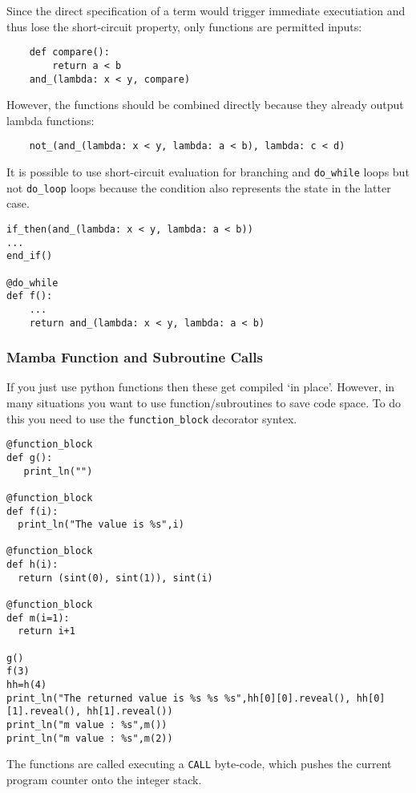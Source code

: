 Since the direct specification of a term would trigger immediate
executiation and thus lose the short-circuit property, only functions
are permitted inputs:

\begin{lstlisting}
    def compare():
        return a < b
    and_(lambda: x < y, compare)
\end{lstlisting}
However, the functions should be combined directly because they
already output lambda functions:

\begin{lstlisting}
    not_(and_(lambda: x < y, lambda: a < b), lambda: c < d)
\end{lstlisting}
It is possible to use short-circuit evaluation for branching and
\verb+do_while+ loops but not \verb+do_loop+ loops because the
condition also represents the state in the latter case.

\begin{lstlisting}
if_then(and_(lambda: x < y, lambda: a < b))
...
end_if()

@do_while
def f():
    ...
    return and_(lambda: x < y, lambda: a < b)
\end{lstlisting}

\subsubsection{Mamba Function and Subroutine Calls}
If you just use python functions then these get compiled
`in place'. However, in many situations you want to use
function/subroutines to save code space. To do this
you need to use the \verb+function_block+ decorator syntex.
\begin{lstlisting}
@function_block
def g():
   print_ln("")

@function_block
def f(i):
  print_ln("The value is %s",i)

@function_block
def h(i):
  return (sint(0), sint(1)), sint(i)

@function_block
def m(i=1):
  return i+1

g()
f(3)
hh=h(4)
print_ln("The returned value is %s %s %s",hh[0][0].reveal(), hh[0][1].reveal(), hh[1].reveal())
print_ln("m value : %s",m())
print_ln("m value : %s",m(2))
\end{lstlisting}
The functions are called executing a \verb+CALL+ byte-code, which
pushes the current program counter onto the integer stack.

